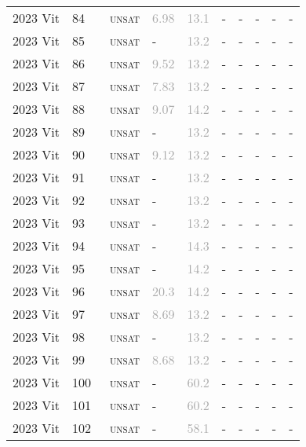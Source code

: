 \begin{center}
{\begin{longtable}{@{}llllllllll@{}}
2023 Vit & 84 & ~\textsc{unsat} & \textcolor{darkgray}{6.98} & \textcolor{darkgray}{13.1} & - & - & - & - & - \\
2023 Vit & 85 & ~\textsc{unsat} & - & \textcolor{darkgray}{13.2} & - & - & - & - & - \\
2023 Vit & 86 & ~\textsc{unsat} & \textcolor{darkgray}{9.52} & \textcolor{darkgray}{13.2} & - & - & - & - & - \\
2023 Vit & 87 & ~\textsc{unsat} & \textcolor{darkgray}{7.83} & \textcolor{darkgray}{13.2} & - & - & - & - & - \\
2023 Vit & 88 & ~\textsc{unsat} & \textcolor{darkgray}{9.07} & \textcolor{darkgray}{14.2} & - & - & - & - & - \\
2023 Vit & 89 & ~\textsc{unsat} & - & \textcolor{darkgray}{13.2} & - & - & - & - & - \\
2023 Vit & 90 & ~\textsc{unsat} & \textcolor{darkgray}{9.12} & \textcolor{darkgray}{13.2} & - & - & - & - & - \\
2023 Vit & 91 & ~\textsc{unsat} & - & \textcolor{darkgray}{13.2} & - & - & - & - & - \\
2023 Vit & 92 & ~\textsc{unsat} & - & \textcolor{darkgray}{13.2} & - & - & - & - & - \\
2023 Vit & 93 & ~\textsc{unsat} & - & \textcolor{darkgray}{13.2} & - & - & - & - & - \\
2023 Vit & 94 & ~\textsc{unsat} & - & \textcolor{darkgray}{14.3} & - & - & - & - & - \\
2023 Vit & 95 & ~\textsc{unsat} & - & \textcolor{darkgray}{14.2} & - & - & - & - & - \\
2023 Vit & 96 & ~\textsc{unsat} & \textcolor{darkgray}{20.3} & \textcolor{darkgray}{14.2} & - & - & - & - & - \\
2023 Vit & 97 & ~\textsc{unsat} & \textcolor{darkgray}{8.69} & \textcolor{darkgray}{13.2} & - & - & - & - & - \\
2023 Vit & 98 & ~\textsc{unsat} & - & \textcolor{darkgray}{13.2} & - & - & - & - & - \\
2023 Vit & 99 & ~\textsc{unsat} & \textcolor{darkgray}{8.68} & \textcolor{darkgray}{13.2} & - & - & - & - & - \\
2023 Vit & 100 & ~\textsc{unsat} & - & \textcolor{darkgray}{60.2} & - & - & - & - & - \\
2023 Vit & 101 & ~\textsc{unsat} & - & \textcolor{darkgray}{60.2} & - & - & - & - & - \\
2023 Vit & 102 & ~\textsc{unsat} & - & \textcolor{darkgray}{58.1} & - & - & - & - & - \\

\end{longtable}}
\end{center}
